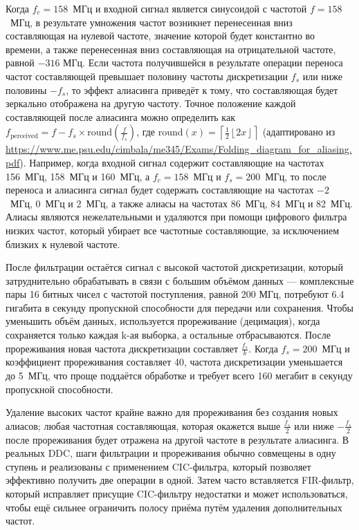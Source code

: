 \documentclass{report}
\begin{document}
Когда $f_c=158$~МГц и входной сигнал является синусоидой с частотой $f=158$~МГц, в результате умножения частот возникнет перенесенная вниз составляющая на нулевой частоте, значение которой будет константно во времени, а также перенесенная вниз составляющая на отрицательной частоте, равной $-316$ МГц. Если частота получившейся в результате операции переноса частот составляющей превышает половину частоты дискретизации $f_s$ или ниже половины $-f_s$, то эффект алиасинга приведёт к тому, что составляющая будет зеркально отображена на другую частоту. Точное положение каждой составляющей после алиасинга можно определить как $f_\text{perceived}=f - f_s \times \text{round}(\frac{f}{f_s})$, где $\text{round}(x)=\left\lceil \frac{1}{2} \left\lfloor 2x \right\rfloor \right\rceil$ (адаптировано из \url{https://www.me.psu.edu/cimbala/me345/Exams/Folding_diagram_for_aliasing.pdf}). Например, когда входной сигнал содержит составляющие на частотах 156~МГц, 158~МГц и 160~МГц, а $f_c=158$~МГц и $f_s=200$~МГц, то после переноса и алиасинга сигнал будет содержать составляющие на частотах $-2$~МГц, 0~МГц и 2~МГц, а также алиасы на частотах 86~МГц, 84~МГц и 82~МГц. Алиасы являются нежелательными и удаляются при помощи цифрового фильтра низких частот, который убирает все частотные составляющие, за исключением близких к нулевой частоте.

После фильтрации остаётся сигнал с высокой частотой дискретизации, который затруднительно обрабатывать в связи с большим объёмом данных --- комплексные пары 16 битных чисел с частотой поступления, равной 200 МГц, потребуют 6.4 гигабита в секунду пропускной способности для передачи или сохранения. Чтобы уменьшить объём данных, используется прореживание (децимация), когда сохраняется только каждая k-ая выборка, а остальные отбрасываются. После прореживания новая частота дискретизации составляет $\frac{f_s}{k}$. Когда $f_s=200$~МГц и коэффициент прореживания составляет 40, частота дискретизации уменьшается до 5~МГц, что проще поддаётся обработке и требует всего 160 мегабит в секунду пропускной способности.

Удаление высоких частот крайне важно для прореживания без создания новых алиасов; любая частотная составляющая, которая окажется выше $\frac{f_s}{2}$ или ниже $-\frac{f_s}{2}$ после прореживания будет отражена на другой частоте в результате алиасинга. В реальных DDC, шаги фильтрации и прореживания обычно совмещены в одну ступень и реализованы с применением CIC-фильтра, который позволяет эффективно получить две операции в одной. Затем часто вставляется FIR-фильтр, который исправляет присущие CIC-фильтру недостатки и может использоваться, чтобы ещё сильнее ограничить полосу приёма путём удаления дополнительных частот.
\end{document}
